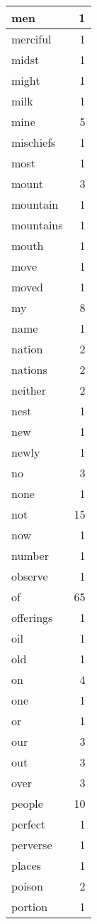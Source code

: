 \begin{center}
\begin{longtable}{l|r}
men & 1 \\ \hline
merciful & 1 \\ \hline
midst & 1 \\ \hline
might & 1 \\ \hline
milk & 1 \\ \hline
mine & 5 \\ \hline
mischiefs & 1 \\ \hline
most & 1 \\ \hline
mount & 3 \\ \hline
mountain & 1 \\ \hline
mountains & 1 \\ \hline
mouth & 1 \\ \hline
move & 1 \\ \hline
moved & 1 \\ \hline
my & 8 \\ \hline
name & 1 \\ \hline
nation & 2 \\ \hline
nations & 2 \\ \hline
neither & 2 \\ \hline
nest & 1 \\ \hline
new & 1 \\ \hline
newly & 1 \\ \hline
no & 3 \\ \hline
none & 1 \\ \hline
not & 15 \\ \hline
now & 1 \\ \hline
number & 1 \\ \hline
observe & 1 \\ \hline
of & 65 \\ \hline
offerings & 1 \\ \hline
oil & 1 \\ \hline
old & 1 \\ \hline
on & 4 \\ \hline
one & 1 \\ \hline
or & 1 \\ \hline
our & 3 \\ \hline
out & 3 \\ \hline
over & 3 \\ \hline
people & 10 \\ \hline
perfect & 1 \\ \hline
perverse & 1 \\ \hline
places & 1 \\ \hline
poison & 2 \\ \hline
portion & 1 \\ \hline

\end{longtable}
\end{center}
